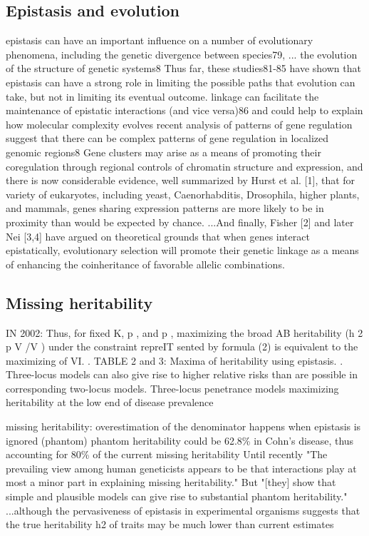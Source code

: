 \subsection{Epistasis and evolution}
epistasis can have an important influence on a number of evolutionary phenomena, including the genetic divergence between species79, ... the evolution of the structure of genetic systems8 \cite{phillips2008epistasis}
Thus far, these studies81-85 have shown that epistasis can have a strong role in limiting the possible paths that evolution can take, but not in limiting its eventual outcome. \cite{phillips2008epistasis}
linkage can facilitate the maintenance of epistatic interactions (and vice versa)86 and could help to explain how molecular complexity evolves \cite{phillips2008epistasis}
recent analysis of patterns of gene regulation suggest that there can be complex patterns of gene regulation in localized genomic regions8 \cite{phillips2008epistasis}
Gene clusters may arise as a means of promoting their coregulation through regional controls of chromatin structure and expression, and there is now considerable evidence, well summarized by Hurst et al. [1], that for variety of eukaryotes, including yeast, Caenorhabditis, Drosophila, higher plants, and mammals, genes sharing expression patterns are more likely to be in proximity than would be expected by chance.  \cite{petkov2005evidence}
...And finally, Fisher [2] and later Nei [3,4] have argued on theoretical grounds that when genes interact epistatically, evolutionary selection will promote their genetic linkage as a means of enhancing the coinheritance of favorable allelic combinations.  \cite{petkov2005evidence}


\subsection{Missing heritability}
IN 2002: Thus, for fixed K, p , and p , maximizing the broad AB heritability (h 2 p V /V ) under the constraint repreIT sented by formula (2) is equivalent to the maximizing of VI. \cite{culverhouse2002perspective}. TABLE 2 and 3: Maxima of heritability using epistasis. \cite{culverhouse2002perspective}. Three-locus models can also give rise to higher relative risks than are possible in corresponding two-locus models. Three-locus penetrance models maximizing heritability at the low end of disease prevalence \cite{culverhouse2002perspective}

missing heritability: overestimation of the denominator happens when epistasis is ignored (phantom) \cite{zuk2012mystery}
phantom heritability could be 62.8\% in Cohn's disease, thus accounting for 80\% of the current missing heritability \cite{zuk2012mystery}
Until recently "The prevailing view among human geneticists appears to be that interactions play at most a minor  part in explaining missing heritability."	 \cite{zuk2012mystery}
But "[they] show that simple and plausible models can give rise to substantial phantom heritability."	 \cite{zuk2012mystery}
...although the pervasiveness of epistasis in experimental organisms suggests that the true heritability h2 of traits may be much lower than current estimates \cite{zuk2012mystery}

